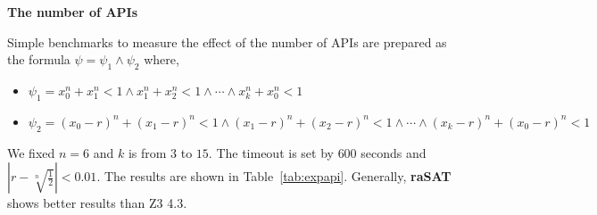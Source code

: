 \documentclass[runningheads,a4paper,oribibl]{llncs}
\newcommand{\smallHead}[1]{%
    \par\vspace{.35cm}\noindent\textbf{#1}%
    \par\noindent\ignorespaces%
}
\begin{document}
\smallHead{The number of APIs}

Simple benchmarks to measure the effect of the number of APIs are prepared as
the formula $\psi = \psi_1 \wedge \psi_2$ where,
\begin{itemize}
\item $\psi_1 = x_0^n + x_1^n< 1 \wedge x_1^n + x_2^n< 1 \wedge \cdots \wedge x_k^n + x_0^n< 1$
\item $\psi_2 = (x_0-r)^n + (x_1-r)^n < 1 \wedge (x_1-r)^n + (x_2-r)^n < 1 
	\wedge \cdots \wedge (x_k-r)^n + (x_0-r)^n < 1$
\end{itemize}
We fixed $n=6$ and $k$ is from $3$ to $15$. 
The timeout is set by $600$ seconds and $|r - \sqrt[n]{\frac{1}{2}}| < 0.01$.
The results are shown in Table~\ref{tab:expapi}. Generally, {\bf raSAT} shows better 
results than Z3 4.3. 
\end{document}
